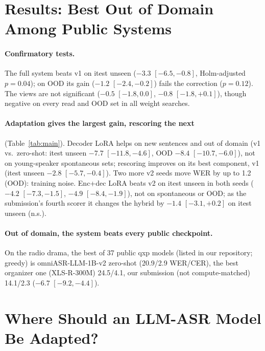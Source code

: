 \documentclass[runningheads]{llncs}
\newcommand{\ci}[2]{$[#1,#2]$}  %
\begin{document}
\section{Results: Best Out of Domain Among Public Systems}\label{sec:results}

\paragraph{Confirmatory tests.} The full system beats v1 on itest unseen ($-3.3$
\ci{-6.5}{-0.8}, Holm-adjusted $p{=}0.04$); on OOD its gain ($-1.2$ \ci{-2.4}{-0.2}) fails the
correction ($p{=}0.12$). The views are not significant ($-0.5$ \ci{-1.8}{0.0},
$-0.8$ \ci{-1.8}{+0.1}), though negative on every read and OOD set in all weight searches.

\paragraph{Adaptation gives the largest gain, rescoring the next} (Table~\ref{tab:main}). Decoder
LoRA helps on new sentences and out of domain (v1 vs.\ zero-shot: itest unseen $-7.7$
\ci{-11.8}{-4.6}, OOD $-8.4$ \ci{-10.7}{-6.0}), not on young-speaker spontaneous sets;
rescoring improves on its best component, v1 (itest unseen $-2.8$ \ci{-5.7}{-0.4}).
Two more v2 seeds move WER by up to 1.2 (OOD): training noise.
Enc+dec LoRA beats v2 on itest unseen in both seeds ($-4.2$ \ci{-7.3}{-1.5}, $-4.9$
\ci{-8.4}{-1.9}), not on spontaneous or OOD; as the submission's fourth scorer it changes the
hybrid by $-1.4$ \ci{-3.1}{+0.2} on itest unseen (n.s.).

\paragraph{Out of domain, the system beats every public checkpoint.} On the radio drama, the best
of 37 public qxp models (listed in our repository; greedy) is omniASR-LLM-1B-v2 zero-shot
(20.9/2.9 WER/CER), the best organizer one (\mbox{XLS-R-300M}) 24.5/4.1, our submission (not
compute-matched) 14.1/2.3 ($-6.7$ \ci{-9.2}{-4.4}).

\section{Where Should an LLM-ASR Model Be Adapted?}\label{sec:where}
\end{document}
